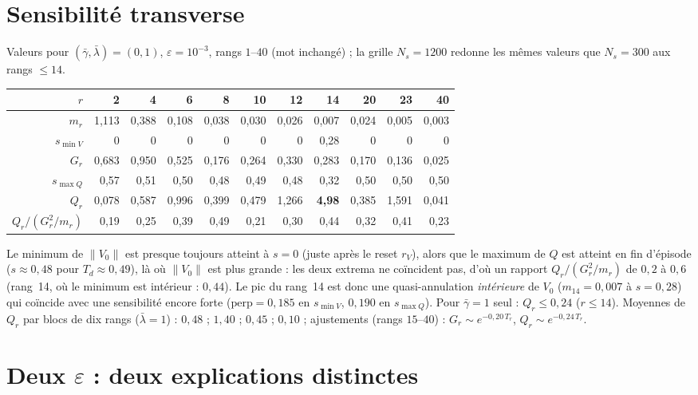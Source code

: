 \documentclass[11pt,a4paper]{article}
\theoremstyle{remark}
\newcommand{\norm}[1]{\lVert #1\rVert}
\begin{document}
\section{Sensibilit\'e transverse}\label{sec:Q}
Valeurs pour $(\bar\gamma,\bar\lambda)=(0,1)$, $\varepsilon=10^{-3}$, rangs $1$--$40$ (mot inchang\'e) ; la grille $N_s=1200$ redonne les m\^emes valeurs que $N_s=300$ aux rangs $\le14$.
\begin{center}\small
\begin{tabular}{r|rrrrrrrrrr}
\toprule
$r$ & 2 & 4 & 6 & 8 & 10 & 12 & 14 & 20 & 23 & 40\\
\midrule
$m_r$ & 1,113 & 0,388 & 0,108 & 0,038 & 0,030 & 0,026 & 0,007 & 0,024 & 0,005 & 0,003\\
$s_{\min V}$ & 0 & 0 & 0 & 0 & 0 & 0 & 0,28 & 0 & 0 & 0\\
$G_r$ & 0,683 & 0,950 & 0,525 & 0,176 & 0,264 & 0,330 & 0,283 & 0,170 & 0,136 & 0,025\\
$s_{\max Q}$ & 0,57 & 0,51 & 0,50 & 0,48 & 0,49 & 0,48 & 0,32 & 0,50 & 0,50 & 0,50\\
$Q_r$ & 0,078 & 0,587 & 0,996 & 0,399 & 0,479 & 1,266 & \textbf{4,98} & 0,385 & 1,591 & 0,041\\
$Q_r/(G_r^2/m_r)$ & 0,19 & 0,25 & 0,39 & 0,49 & 0,21 & 0,30 & 0,44 & 0,32 & 0,41 & 0,23\\
\bottomrule
\end{tabular}
\end{center}
Le minimum de $\norm{V_0}$ est presque toujours atteint \`a $s=0$ (juste apr\`es le reset $r_V$), alors que le maximum de $Q$ est atteint en fin d'\'episode ($s\approx0{,}48$ pour $T_d\approx0{,}49$), l\`a o\`u $\norm{V_0}$ est plus grande : les deux extrema ne coïncident pas, d'o\`u un rapport $Q_r/(G_r^2/m_r)$ de $0{,}2$ \`a $0{,}6$ (rang~14, o\`u le minimum est int\'erieur : $0{,}44$). Le pic du rang~14 est donc une quasi-annulation \emph{int\'erieure} de $V_0$ ($m_{14}=0{,}007$ \`a $s=0{,}28$) qui coïncide avec une sensibilit\'e encore forte ($\mathrm{perp}=0{,}185$ en $s_{\min V}$, $0{,}190$ en $s_{\max Q}$). Pour $\bar\gamma=1$ seul : $Q_r\le0{,}24$ ($r\le14$). Moyennes de $Q_r$ par blocs de dix rangs ($\bar\lambda=1$) : $0{,}48$ ; $1{,}40$ ; $0{,}45$ ; $0{,}10$ ; ajustements (rangs $15$--$40$) : $G_r\sim e^{-0{,}20\,T_r}$, $Q_r\sim e^{-0{,}24\,T_r}$.

\section{Deux $\varepsilon$ : deux explications distinctes}\label{sec:eps}
\end{document}
